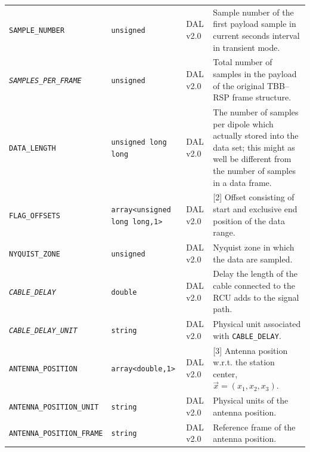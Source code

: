 \documentclass[a4paper,10pt,bibtotoc]{scrartcl}
\begin{document}
\begin{center}
\begin{supertabular}{|lllp{4.25cm}|}
    \small {\texttt{SAMPLE\_NUMBER}} & \verb|unsigned| & DAL v2.0 & Sample number of the first payload sample in current seconds interval in transient mode. \\
    \small \textit{\texttt{SAMPLES\_PER\_FRAME}} & \verb|unsigned| & DAL v2.0 & Total number of samples in the payload of the original TBB--RSP frame structure. \\
    \small {\texttt{DATA\_LENGTH}} & \verb|unsigned long long| & DAL v2.0 & The number of samples per dipole which actually stored into the data set; this might as well be different from the number of samples in a data frame. \\
    \small {\texttt{FLAG\_OFFSETS}} & \verb|array<unsigned long long,1>| & DAL v2.0 & [2] Offset consisting of start and exclusive end position of the data range.\\
    \small {\texttt{NYQUIST\_ZONE}} & \verb|unsigned| & DAL v2.0 & Nyquist zone in which the data are sampled. \\
    \small \textit{\texttt{CABLE\_DELAY}} & \verb|double| & DAL v2.0 & Delay the length of the cable connected to the RCU adds to the signal path. \\
    \small \textit{\texttt{CABLE\_DELAY\_UNIT}} & \verb|string| & DAL v2.0 & Physical unit associated with \verb|CABLE_DELAY|. \\
    \small {\texttt{ANTENNA\_POSITION}} & \verb|array<double,1>| & DAL v2.0 & [3] Antenna position w.r.t. the station center, $\vec x = (x_1,x_2,x_3)$. \\
    \small {\texttt{ANTENNA\_POSITION\_UNIT}} & \verb|string| & DAL v2.0 & Physical units of the antenna position. \\
    \small {\texttt{ANTENNA\_POSITION\_FRAME}} & \verb|string| & DAL v2.0 & Reference frame of the antenna position. \\

\end{supertabular}
\end{center}
\end{document}
